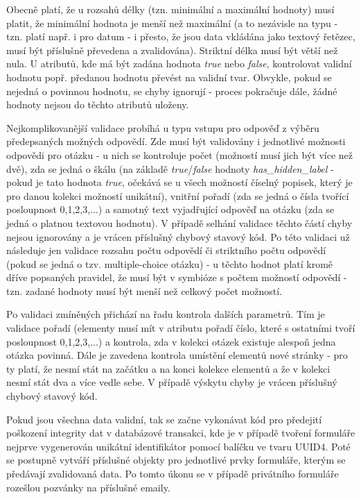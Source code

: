 			Obecně platí, že u rozsahů délky (tzn. minimální a maximální hodnoty) musí platit, že minimální hodnota je menší než maximální (a to nezávisle na typu - tzn. platí např. i pro datum - i přesto, že jsou data vkládána jako textový řetězec, musí být příslušně převedena a zvalidována). Striktní délka musí být větší než nula. U atributů, kde má být zadána hodnota \textit{true} nebo \textit{false}, kontrolovat validní hodnotu popř. předanou hodnotu převést na validní tvar. Obvykle, pokud se nejedná o povinnou hodnotu, se chyby ignorují - proces pokračuje dále, žádné hodnoty nejsou do těchto atributů uloženy.
			
			Nejkomplikovanější validace probíhá u typu vstupu pro odpověď z výběru předepsaných možných odpovědí. Zde musí být validovány i jednotlivé možnosti odpovědi pro otázku - u nich se kontroluje počet (možností musí jich být více než dvě), zda se jedná o škálu (na základě \textit{true}/\textit{false} hodnoty \textit{has\_hidden\_label} - pokud je tato hodnota \textit{true}, očekává se u všech možností číselný popisek, který je pro danou kolekci možností unikátní), vnitřní pořadí (zda se jedná o čísla tvořící posloupnost 0,1,2,3,...) a samotný text vyjadřující odpověď na otázku (zda se jedná o platnou textovou hodnotu). V případě selhání validace těchto částí chyby nejsou ignorovány a je vrácen příslušný chybový stavový kód. Po této validaci už následuje jen validace rozsahu počtu odpovědí či striktního počtu odpovědí (pokud se jedná o tzv. multiple-choice otázku) - u těchto hodnot platí kromě dříve popsaných pravidel, že musí být v symbióze s počtem možností odpovědí - tzn. zadané hodnoty musí být menší než celkový počet možností.
			
			Po validaci zmíněných přichází na řadu kontrola dalších parametrů. Tím je validace pořadí (elementy musí mít v atributu pořadí číslo, které s ostatními tvoří posloupnost 0,1,2,3,...) a kontrola, zda v kolekci otázek existuje alespoň jedna otázka povinná. Dále je zavedena kontrola umístění elementů nové stránky - pro ty platí, že nesmí stát na začátku a na konci kolekce elementů a že v kolekci nesmí stát dva a více vedle sebe. V případě výskytu chyby je vrácen příslušný chybový stavový kód.
			
			Pokud jsou všechna data validní, tak se začne vykonávat kód pro předejití poškození integrity dat v databázové transakci, kde je v případě tvoření formuláře nejprve vygenerován unikátní identifikátor pomocí balíčku  ve tvaru UUID4. Poté se postupně vytváří příslušné objekty pro jednotlivé prvky formuláře, kterým se předávají zvalidovaná data. Po tomto úkonu se v případě privátního formuláře rozešlou pozvánky na příslušné emaily.
			

